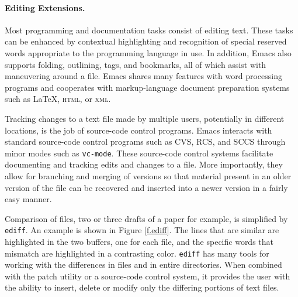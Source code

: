 \documentclass{article}
\newcommand{\stexttt}[1]{{\small\texttt{#1}}}
\begin{document}


\paragraph{Editing Extensions.}
Most programming and documentation tasks consist of editing text.
These tasks can be enhanced by contextual highlighting and recognition
of special reserved words appropriate to the programming language in
use.  In addition, Emacs also supports folding, outlining, tags, and
bookmarks, all of which assist with maneuvering around a file.  Emacs
shares many features with word processing programs and cooperates with
markup-language document preparation systems such as \LaTeX,
\textsc{html}, or \textsc{xml}.

Tracking changes to a text file made by multiple users, potentially in
different locations, is the job of source-code control programs.
Emacs interacts with standard source-code control programs such as
CVS, RCS, and SCCS through minor modes such as \stexttt{vc-mode}.
These source-code control systems facilitate documenting and tracking
edits and changes to a file.  More importantly, they allow for
branching and merging of versions so that material present in an older
version of the file can be recovered and inserted into a newer version
in a fairly easy manner.

Comparison of files, two or three drafts of a paper for example, is
simplified by \stexttt{ediff}.  An example is shown in Figure
\ref{f.ediff}.  The lines that are similar are highlighted in the two
buffers, one for each file, and the specific words that mismatch are
highlighted in a contrasting color.  \stexttt{ediff} has many tools
for working with the differences in files and in entire directories.
When combined with the patch utility or a source-code control system,
it provides the user with the ability to insert, delete or modify only
the differing portions of text files.
\end{document}
